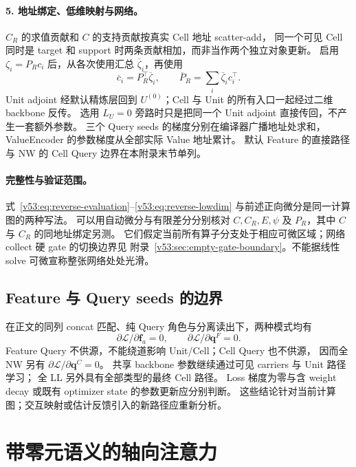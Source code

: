 \documentclass[11pt,UTF8,fontset=fandol]{ctexart}
\numberwithin{equation}{section}
\theoremstyle{definition}
\begin{document}
\paragraph{5. 地址绑定、低维映射与网络。}
$C_R$ 的求值贡献和 $C$ 的支持贡献按真实 Cell 地址 scatter-add，
同一个可见 Cell 同时是 target 和 support 时两条贡献相加，而非当作两个独立对象更新。
启用 $\zeta_i=P_Rc_i$ 后，从各次使用汇总 $\overline\zeta_i$，再使用
\begin{equation}
 \overline c_i=P_R^\top\overline\zeta_i,\qquad
 \overline P_R=\sum_i\overline\zeta_i c_i^\top.
 \label{v53:eq:reverse-lowdim}
\end{equation}
Unit adjoint 经默认精炼层回到 $U^{(0)}$；Cell 与 Unit 的所有入口一起经过二维 backbone 反传。
选用 $L_U=0$ 旁路时只是把同一个 Unit adjoint 直接传回，不产生一套额外参数。
三个 Query seeds 的梯度分别在编译器广播地址处求和，ValueEncoder 的参数梯度从全部实际 Value 地址累计。
默认 Feature 的直接路径与 NW 的 Cell Query 边界在本附录末节单列。

\paragraph{完整性与验证范围。}
式~\eqref{v53:eq:reverse-evaluation}--\eqref{v53:eq:reverse-lowdim} 与前述正向微分是同一计算图的两种写法。
可以用自动微分与有限差分分别核对 $C,C_R,E,\psi$ 及 $P_R$，其中 $C$ 与 $C_R$ 的同地址绑定另测。
它们假定当前所有算子分支处于相应可微区域；网络 collect 硬 gate 的切换边界见
附录~\ref{v53:sec:empty-gate-boundary}。不能据线性 solve 可微宣称整张网络处处光滑。

\subsection{Feature 与 Query seeds 的边界}
在正文的同列 concat 匹配、纯 Query 角色与分离读出下，两种模式均有
\begin{equation}
 \partial\mathcal L/\partial\bm f_a=0,\qquad
 \partial\mathcal L/\partial\bm q^F=0.
 \label{eq:T:split-readout-gradient}
\end{equation}
Feature Query 不供源，不能绕道影响 Unit/Cell；Cell Query 也不供源，
因而全 NW 另有 $\partial\mathcal L/\partial\bm q^C=0$。
共享 backbone 参数继续通过可见 carriers 与 Unit 路径学习；
全 LL 另外具有全部类型的最终 Cell 路径。
Loss 梯度为零与含 weight decay 或既有 optimizer state 的参数更新应分别判断。
这些结论针对当前计算图；交互映射或估计反馈引入的新路径应重新分析。


\section{带零元语义的轴向注意力}
\label{sec:A:attention}
\end{document}
